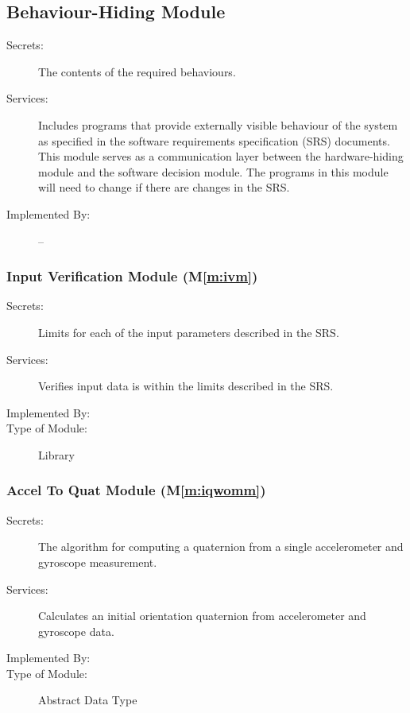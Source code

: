 \documentclass[12pt, titlepage]{article}
\newcommand{\mref}[1]{M\ref{#1}}
\begin{document}
\subsection{Behaviour-Hiding Module}

\begin{description}
\item[Secrets:]The contents of the required behaviours.
\item[Services:]Includes programs that provide externally visible behaviour of the system as
  specified in the software requirements specification (SRS) documents. This module serves as a
  communication layer between the hardware-hiding module and the software decision module. The
  programs in this module will need to change if there are changes in the SRS.
\item[Implemented By:] --
\end{description}

\subsubsection{Input Verification Module (\mref{m:ivm})}

\begin{description}
\item[Secrets:] Limits for each of the input parameters described in the SRS.
\item[Services:] Verifies input data is within the limits described in the SRS.
\item[Implemented By:] \progname
\item[Type of Module:] Library
\end{description}

\subsubsection{Accel To Quat Module (\mref{m:iqwomm})}

\begin{description}
\item[Secrets:] The algorithm for computing a quaternion from a single accelerometer and gyroscope measurement.
\item[Services:] Calculates an initial orientation quaternion from accelerometer and gyroscope data.
\item[Implemented By:] \progname
\item[Type of Module:] Abstract Data Type
\end{description}
\end{document}
